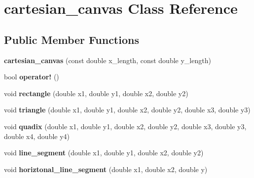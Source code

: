 \hypertarget{classcartesian__canvas}{}\section{cartesian\+\_\+canvas Class Reference}
\label{classcartesian__canvas}
\subsection*{Public Member Functions}
\begin{DoxyCompactItemize}
\item 
\mbox{\label{classcartesian__canvas_a40fb4a9c7ac5817c353b80a0e25ad300}} 
{\bfseries cartesian\+\_\+canvas} (const double x\+\_\+length, const double y\+\_\+length)
\item 
\mbox{\label{classcartesian__canvas_abd51f092b8273ff51448c75f1048ed78}} 
bool {\bfseries operator!} ()
\item 
\mbox{\label{classcartesian__canvas_aba786ca63fdb2de74a828ab493de080e}} 
void {\bfseries rectangle} (double x1, double y1, double x2, double y2)
\item 
\mbox{\label{classcartesian__canvas_a987ac78d05167c69d324f22fa37f360c}} 
void {\bfseries triangle} (double x1, double y1, double x2, double y2, double x3, double y3)
\item 
\mbox{\label{classcartesian__canvas_aa3f810c794379fa7e4478c1bb35167e6}} 
void {\bfseries quadix} (double x1, double y1, double x2, double y2, double x3, double y3, double x4, double y4)
\item 
\mbox{\label{classcartesian__canvas_ac1da59b41e33c08bef2a7b4228e269a5}} 
void {\bfseries line\+\_\+segment} (double x1, double y1, double x2, double y2)
\item 
\mbox{\label{classcartesian__canvas_a50628271acf211e667db48ce47be70e8}} 
void {\bfseries horiztonal\+\_\+line\+\_\+segment} (double x1, double x2, double y)
\item 
\mbox{\label{classcartesian__canvas_ab3ccd117b7e4b0b9039f2c77930c2a1a}} 

\end{DoxyCompactItemize}
